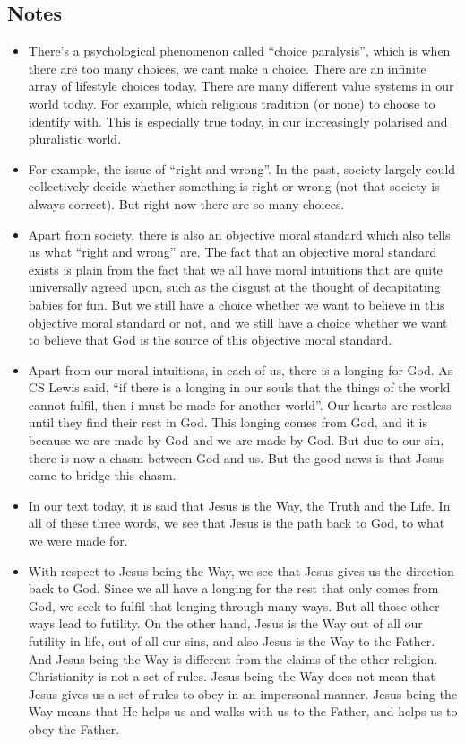 \subsection*{Notes}
\begin{itemize}
  \item{There’s a psychological phenomenon called “choice paralysis”, which is when there are too many choices, we cant make a choice. There are an infinite array of lifestyle choices today. There are many different value systems in our world today. For example, which religious tradition (or none) to choose to identify with. This is especially true today, in our increasingly polarised and pluralistic world.}
  \item{For example, the issue of “right and wrong”. In the past, society largely could collectively decide whether something is right or wrong (not that society is always correct). But right now there are so many choices. }
  \item{Apart from society, there is also an objective moral standard which also tells us what “right and wrong” are. The fact that an objective moral standard exists is plain from the fact that we all have moral intuitions that are quite universally agreed upon, such as the disgust at the thought of decapitating babies for fun. But we still have a choice whether we want to believe in this objective moral standard or not, and we still have a choice whether we want to believe that God is the source of this objective moral standard.}
  \item{Apart from our moral intuitions, in each of us, there is a longing for God. As CS Lewis said, “if there is a longing in our souls that the things of the world cannot fulfil, then i must be made for another world”. Our hearts are restless until they find their rest in God. This longing comes from God, and it is because we are made by God and we are made by God. But due to our sin, there is now a chasm between God and us. But the good news is that Jesus came to bridge this chasm.}
  \item{In our text today, it is said that Jesus is the Way, the Truth and the Life. In all of these three words, we see that Jesus is the path back to God, to what we were made for.}
  \item{With respect to Jesus being the Way, we see that Jesus gives us the direction back to God. Since we all have a longing for the rest that only comes from God, we seek to fulfil that longing through many ways. But all those other ways lead to futility. On the other hand, Jesus is the Way out of all our futility in life, out of all our sins, and also Jesus is the Way to the Father. And Jesus being the Way is different from the claims of the other religion. Christianity is not a set of rules. Jesus being the Way does not mean that Jesus gives us a set of rules to obey in an impersonal manner. Jesus being the Way means that He helps us and walks with us to the Father, and helps us to obey the Father.}

\end{itemize}
